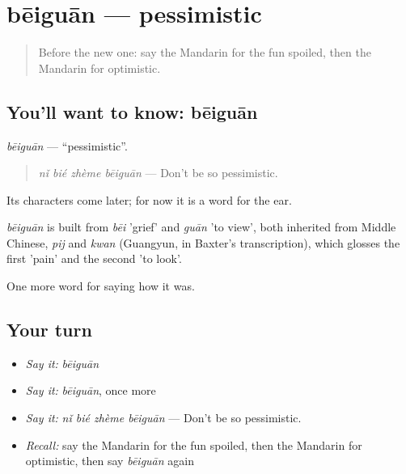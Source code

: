 \section[bēiguān]{bēiguān — pessimistic}

\label{lesson:ZH-C465-beiguan}



\begin{quote}
Before the new one: say the Mandarin for the fun spoiled, then the Mandarin for optimistic.
\end{quote}

\subsection*{You'll want to know: bēiguān}
\emph{bēiguān} — \textquotedblleft{}pessimistic\textquotedblright{}.

\begin{quote}
\emph{nǐ bié zhème bēiguān} — Don't be so pessimistic.
\end{quote}

Its characters come later; for now it is a word for the ear.

\begin{cousinweb}
\emph{bēiguān} is built from \emph{bēi} 'grief' and \emph{guān} 'to view', both inherited from Middle Chinese, \emph{pij} and \emph{kwan} (Guangyun, in Baxter's transcription), which glosses the first 'pain' and the second 'to look'.
\end{cousinweb}

\begin{grammarlens}[title={What you've built}]
One more word for saying how it was.
\end{grammarlens}

\subsection*{Your turn}
\begin{itemize}
\raggedright
  \item \emph{Say it:} \emph{bēiguān}
  \item \emph{Say it:} \emph{bēiguān}, once more
  \item \emph{Say it:} \emph{nǐ bié zhème bēiguān} — Don't be so pessimistic.
  \item \emph{Recall:} say the Mandarin for the fun spoiled, then the Mandarin for optimistic, then say \emph{bēiguān} again
\end{itemize}

